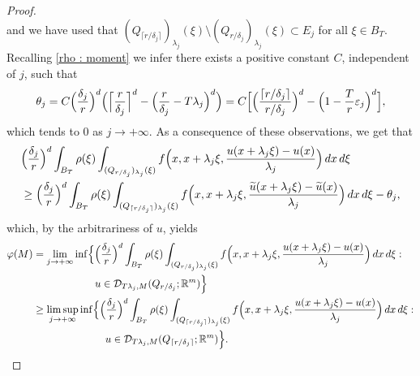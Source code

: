 \documentclass{article}
\theoremstyle{definition}
\newcommand{\f}{\varphi}
\newcommand{\ej}{\varepsilon_j}
\newcommand{\dej}{\delta_j}
\newcommand{\R}{\mathbb{R}}
\begin{document}
\begin{proof}
\begin{equation}
\end{equation}
and we have used that $(Q_{\lceil r/\dej \rceil })_{\lambda_j}(\xi) \setminus (Q_{r/\dej})_{\lambda_j}(\xi)\subset E_j$ for all $\xi\in B_T$. Recalling \eqref{rho : moment} we infer there exists a positive constant $C$, independent of $j$, such that
\begin{equation*}
 \theta_j  = C \Bigl(\frac{\dej}{r}\Bigr)^d \Bigl( \Bigl\lceil \frac{r}{\dej} \Bigr\rceil^d - \Bigl(\frac{r}{\dej}-T\lambda_j\Bigr)^d \Bigr)  = C\Bigl[\Bigl( \frac{\lceil {r/\dej} \rceil}{r/\dej}\Bigr)^d - \Bigl(1-\frac{T}{r}\ej\Bigr)^d \Bigr],
\end{equation*}
which tends to $0$ as $j\to+\infty$. As a consequence of these observations, we get that
\begin{align*}
     &\Bigl(\frac{\dej}{r}\Bigr)^d\int_{B_T} \rho(\xi)\int_{(Q_{r/\dej})_{\lambda_j}(\xi)} f\Bigl(x,x+\lambda_j\xi,\frac{u(x+\lambda_j\xi)-u(x)}{\lambda_j}\Bigr)\, dx\,d\xi \\
     & \geq \Bigl(\frac{\dej}{r}\Bigr)^d\int_{B_T} \rho(\xi)\int_{(Q_{\lceil r/\dej \rceil })_{\lambda_j}(\xi)} f\Bigl(x,x+\lambda_j\xi,\frac{\widetilde{u}(x+\lambda_j\xi)-\widetilde{u}(x)}{\lambda_j}\Bigr)\, dx\,d\xi -\theta_j,    
\end{align*}
which, by the arbitrariness of $u$, yields
\begin{align*}
    \f(M) & = \lim_{j\to+\infty} \inf\Bigl\{ \Bigl(\frac{\dej}{r}\Bigr)^d\int_{B_T} \rho(\xi)\int_{(Q_{r/\dej})_{\lambda_j}(\xi)} f\Bigl(x,x+\lambda_j\xi,\frac{u(x+\lambda_j\xi)-u(x)}{\lambda_j}\Bigr)\, dx\,d\xi : \\
    & \qquad \qquad \qquad  u\in \mathcal{D}_{T\lambda_j,M}(Q_{r/\dej}; \R^m) \Bigr\} \\
    & \geq \limsup_{j\to+\infty} \inf\Bigl\{\Bigl(\frac{\dej}{r}\Bigr)^d\int_{B_T} \rho(\xi)\int_{(Q_{\lceil r/\dej\rceil})_{\lambda_j}(\xi)} f\Bigl(x,x+\lambda_j\xi,\frac{u(x+\lambda_j\xi)-u(x)}{\lambda_j}\Bigr)\, dx\,d\xi : \\
    & \qquad \qquad \qquad \quad u\in \mathcal{D}_{T\lambda_j,M}(Q_{\lceil r/\dej\rceil}; \R^m) \Bigr\}.
\end{align*}


\end{proof}
\end{document}
